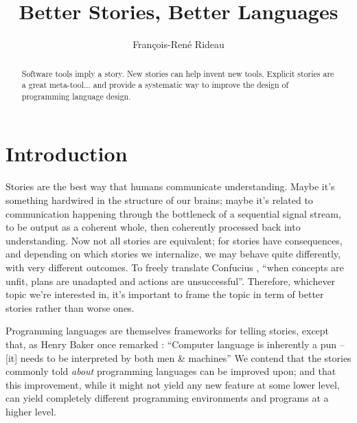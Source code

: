 \documentclass[a4paper,UKenglish]{lipics}
\title{Better Stories, Better Languages}
\author{François-René Rideau}
\affil{TUNES Project\\
  \texttt{fare@tunes.org}}
\begin{document}
\newcommand{\Sad}{Sad...}
\newcommand{\Rad}{Better!}
\newcommand{\Krad}{Even better!}
\newcommand{\proglang}{programming language}
\newcommand{\proglangs}{programming languages}
\newcommand{\PL}{Programming Language}
\newcommand{\SadBetter}[3]{\subsection{#1} \par #2 \par #3 \par}
\newcommand{\SadBetterEvenBetter}[4]{\subsection{#1} \par #2 \par #3 \par #4 \par}

\maketitle

\begin{abstract}
  Software tools imply a story.
  New stories can help invent new tools.
  Explicit stories are a great meta-tool...
  and provide a systematic way to improve
  the design of programming language design.
\end{abstract}

\section{Introduction}

Stories are the best way that humans communicate understanding.
Maybe it's something hardwired in the structure of our brains;
maybe it's related to communication happening
through the bottleneck of a sequential signal stream,
to be output as a coherent whole,
then coherently processed back into understanding.
Now not all stories are equivalent; for stories have consequences,
and depending on which stories we internalize,
we may behave quite differently, with very different outcomes.
To freely translate Confucius \cite{Analects},
``when concepts are unfit, plans are unadapted and actions are unsuccessful''.
Therefore, whichever topic we're interested in,
it's important to frame the topic in term of better stories rather than worse ones.

Programming languages are themselves frameworks for telling stories,
except that, as Henry Baker once remarked \cite{HBaker2005}:
``Computer language is inherently a pun – [it] needs to be interpreted by both men \& machines''
We contend that the stories commonly told \emph{about} programming languages can be improved upon;
and that this improvement, while it might not yield any new feature at some lower level,
can yield completely different programming environments and programs at a higher level.
\end{document}
